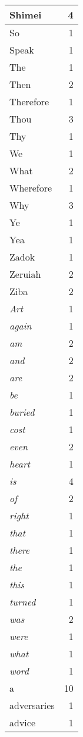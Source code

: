 \begin{center}
\begin{longtable}{l|r}
Shimei & 4 \\ \hline
So & 1 \\ \hline
Speak & 1 \\ \hline
The & 1 \\ \hline
Then & 2 \\ \hline
Therefore & 1 \\ \hline
Thou & 3 \\ \hline
Thy & 1 \\ \hline
We & 1 \\ \hline
What & 2 \\ \hline
Wherefore & 1 \\ \hline
Why & 3 \\ \hline
Ye & 1 \\ \hline
Yea & 1 \\ \hline
Zadok & 1 \\ \hline
Zeruiah & 2 \\ \hline
Ziba & 2 \\ \hline
\emph{Art} & 1 \\ \hline
\emph{again} & 1 \\ \hline
\emph{am} & 2 \\ \hline
\emph{and} & 2 \\ \hline
\emph{are} & 2 \\ \hline
\emph{be} & 1 \\ \hline
\emph{buried} & 1 \\ \hline
\emph{cost} & 1 \\ \hline
\emph{even} & 2 \\ \hline
\emph{heart} & 1 \\ \hline
\emph{is} & 4 \\ \hline
\emph{of} & 2 \\ \hline
\emph{right} & 1 \\ \hline
\emph{that} & 1 \\ \hline
\emph{there} & 1 \\ \hline
\emph{the} & 1 \\ \hline
\emph{this} & 1 \\ \hline
\emph{turned} & 1 \\ \hline
\emph{was} & 2 \\ \hline
\emph{were} & 1 \\ \hline
\emph{what} & 1 \\ \hline
\emph{word} & 1 \\ \hline
a & 10 \\ \hline
adversaries & 1 \\ \hline
advice & 1 \\ \hline

\end{longtable}
\end{center}
